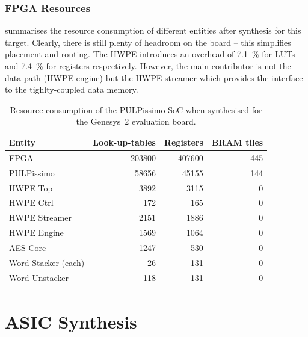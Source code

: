 \documentclass[a4paper, 12pt]{article}
\begin{document}
\subsubsection{FPGA Resources}

 summarises the resource consumption of different entities after synthesis for this target. Clearly, there is still plenty of headroom on the board -- this simplifies placement and routing. The HWPE introduces an overhead of \SI{7.1}{\percent} for LUTs and \SI{7.4}{\percent} for registers respectively. However, the main contributor is not the data path (HWPE engine) but the HWPE streamer which provides the interface to the tighlty-coupled data memory.

\begin{table}[h]
    \centering
    \begin{tabular}{l|r r r}
        \toprule
        Entity &  Look-up-tables & Registers & BRAM tiles \\
        \midrule
		FPGA &  203800 &  407600 &  445 \\
		\hspace{2mm}PULPissimo & 58656 & 45155 & 144 \\ 
		\hspace{4mm}HWPE Top & 3892 & 3115 & 0 \\ 
		\hspace{6mm}HWPE Ctrl & 172 & 165 & 0 \\ 
		\hspace{6mm}HWPE Streamer & 2151 & 1886 & 0 \\ 
		\hspace{6mm}HWPE Engine & 1569 & 1064 & 0 \\ 
		\hspace{8mm}AES Core & 1247 & 530 & 0 \\ 
		\hspace{8mm}Word Stacker (each) & 26 & 131 & 0 \\ 
		\hspace{8mm}Word Unstacker & 118 & 131 & 0 \\
        \bottomrule
    \end{tabular}
	\caption{Resource consumption of the PULPissimo SoC when synthesised for the Genesys~2 evaluation board.}
	\label{tab:results-genesys}
\end{table}

\pagebreak
\section{ASIC Synthesis} \label{sec:asic}
\end{document}
